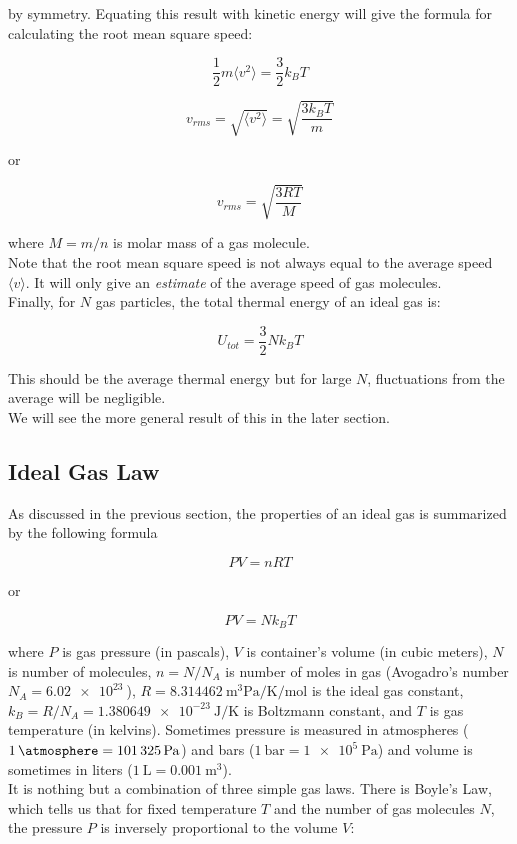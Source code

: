 \documentclass[12pt, a4paper]{article}
\begin{document}
by symmetry. Equating this result with kinetic energy will give the formula for calculating the root mean square speed:

$$\frac12m\langle v^2 \rangle=\frac32k_BT$$

$$v_{rms}=\sqrt{\langle v^2 \rangle}=\sqrt{\frac{3k_BT}{m}}$$

or

$$v_{rms}=\sqrt{\frac{3RT}{M}}$$

where $M=m/n$ is molar mass of a gas molecule. \\

Note that the root mean square speed is not always equal to the average speed $\langle v \rangle$. It will only give an \textit{estimate} of the average speed of gas molecules. \\

Finally, for $N$ gas particles, the total thermal energy of an ideal gas is:

$$\boxed{U_{tot}=\frac32Nk_BT}$$

This should be the average thermal energy but for large $N$, fluctuations from the average will be negligible. \\

We will see the more general result of this in the later section.

\subsection{Ideal Gas Law}

As discussed in the previous section, the properties of an ideal gas is summarized by the following formula

\[ PV=nRT \]

or

\[ PV=Nk_BT \]

where $P$ is gas pressure (in pascals), $V$ is container's volume (in cubic meters), $N$ is number of molecules, $n=N/N_A$ is number of moles in gas (Avogadro's number $N_A=\SI{6.02e23}{}$), $R=\SI{8.314462}{\cubic\meter\pascal\per\kelvin\per\mole}$ is the ideal gas constant, $k_B=R/N_A=\SI{1.380649e-23}{\joule\per\kelvin}$ is Boltzmann constant, and $T$ is gas temperature (in kelvins). Sometimes pressure is measured in atmospheres ($\SI{1}{\atmosphere}=\SI{101325}{\pascal}$) and bars ($\SI{1}{\bar}=\SI{1e5}{\pascal}$) and volume is sometimes in liters ($\SI{1}{\liter}=\SI{0.001}{\cubic\meter}$). \\

It is nothing but a combination of three simple gas laws. There is Boyle's Law, which tells us that for fixed temperature $T$ and the number of gas molecules $N$, the pressure $P$ is inversely proportional to the volume $V$:
\end{document}
